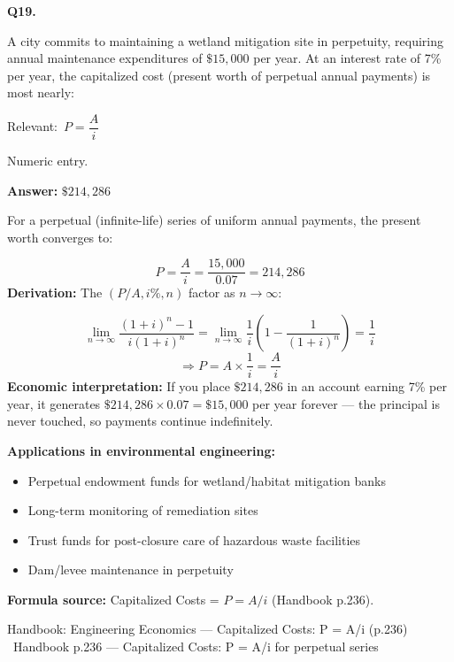 \documentclass[11pt]{article}
\begin{document}
\vspace{9pt}
\filbreak
\textbf{\color{accent}Q19.}\par\vspace{2pt}
A city commits to maintaining a wetland mitigation site in perpetuity, requiring annual maintenance expenditures of $\$15{,}000$ per year. At an interest rate of 7\% per year, the capitalized cost (present worth of perpetual annual payments) is most nearly:\par\par\vspace{3pt}
{\small\color{soft}Relevant:}\ $P = \dfrac{A}{i}$\par\vspace{3pt}
{\small\color{soft}Numeric entry.}\par\vspace{3pt}
\vspace{2pt}\par\noindent\colorbox{boxbg}{\parbox{\dimexpr\linewidth-2\fboxsep\relax}{%
\vspace{2pt}\textbf{Answer:} $\$214{,}286$\par\vspace{2pt}
{\small For a perpetual (infinite-life) series of uniform annual payments, the present worth converges to:\par
\[P = \frac{A}{i} = \frac{15{,}000}{0.07} = 214{,}286\]
\textbf{Derivation:} The $(P/A, i\%, n)$ factor as $n \to \infty$:\par
\[\lim_{n \to \infty} \frac{(1+i)^n - 1}{i(1+i)^n} = \lim_{n \to \infty} \frac{1}{i}\left(1 - \frac{1}{(1+i)^n}\right) = \frac{1}{i}\]
\[\Rightarrow P = A \times \frac{1}{i} = \frac{A}{i}\]
\textbf{Economic interpretation:} If you place $\$214{,}286$ in an account earning 7\% per year, it generates $\$214{,}286 \times 0.07 = \$15{,}000$ per year forever --- the principal is never touched, so payments continue indefinitely.\par
\textbf{Applications in environmental engineering:}\par
\begin{itemize}\setlength{\itemsep}{0pt}\setlength{\parskip}{0pt}
\item Perpetual endowment funds for wetland/habitat mitigation banks
\item Long-term monitoring of remediation sites
\item Trust funds for post-closure care of hazardous waste facilities
\item Dam/levee maintenance in perpetuity
\end{itemize}
\textbf{Formula source:} Capitalized Costs = $P = A/i$ (Handbook p.236).\par}\par\vspace{2pt}
{\footnotesize\color{soft}Handbook: Engineering Economics --- Capitalized Costs: P = A/i (p.236) \textbullet\ Handbook p.236 --- Capitalized Costs: P = A/i for perpetual series}\vspace{2pt}
}}
\end{document}
